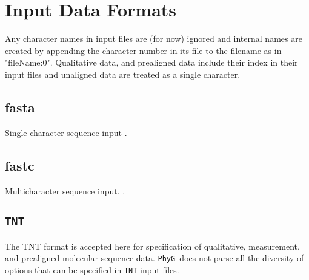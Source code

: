 \documentclass[11pt]{book}
\newcommand{\phyg}{\texttt{PhyG }}
\begin{document}
\section{Input Data Formats}
	Any character names in input files are (for now) ignored and internal names are created
	by appending the character number in its file to the filename as in "fileName:0".
	Qualitative data, and prealigned data include their index in their input files and unaligned 
	data are treated as a single character.
	
	\subsection{fasta}
		Single character sequence input \citep{PearsonandLipman1988}.
		
	\subsection{fastc}
		Multicharacter sequence input.  \citep{WheelerandWashburn2019}.
		
	\subsection{\texttt{TNT}}
		The TNT \citep{Goloboffetal2008} format is accepted here for specification of qualitative,
		measurement, and prealigned molecular sequence data. \phyg does not parse all the
		diversity of options that can be specified in \texttt{TNT} input files.\\
		
\end{document}
